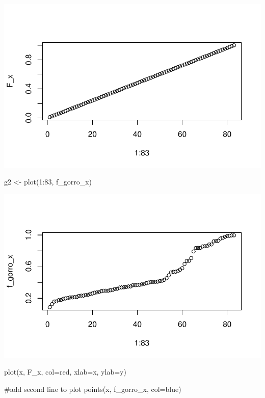 \documentclass[
  us-letterpaper,
]{scrreprt}
\newenvironment{Shaded}{\begin{snugshade}}{\end{snugshade}}
\newcommand{\AttributeTok}[1]{\textcolor[rgb]{0.40,0.45,0.13}{#1}}
\newcommand{\CommentTok}[1]{\textcolor[rgb]{0.37,0.37,0.37}{#1}}
\newcommand{\DecValTok}[1]{\textcolor[rgb]{0.68,0.00,0.00}{#1}}
\newcommand{\FunctionTok}[1]{\textcolor[rgb]{0.28,0.35,0.67}{#1}}
\newcommand{\NormalTok}[1]{\textcolor[rgb]{0.00,0.23,0.31}{#1}}
\newcommand{\OtherTok}[1]{\textcolor[rgb]{0.00,0.23,0.31}{#1}}
\newcommand{\SpecialCharTok}[1]{\textcolor[rgb]{0.37,0.37,0.37}{#1}}
\newcommand{\StringTok}[1]{\textcolor[rgb]{0.13,0.47,0.30}{#1}}
\theoremstyle{plain}
\theoremstyle{plain}
\theoremstyle{definition}
\theoremstyle{remark}
\begin{document}
\includegraphics{Estudio_caso_files/figure-pdf/unnamed-chunk-27-1.pdf}

\begin{Shaded}
\begin{Highlighting}[]
\NormalTok{g2 }\OtherTok{\textless{}{-}} \FunctionTok{plot}\NormalTok{(}\DecValTok{1}\SpecialCharTok{:}\DecValTok{83}\NormalTok{, f\_gorro\_x) }
\end{Highlighting}
\end{Shaded}

\includegraphics{Estudio_caso_files/figure-pdf/unnamed-chunk-27-2.pdf}

\begin{Shaded}
\begin{Highlighting}[]
\FunctionTok{plot}\NormalTok{(x, F\_x, }\AttributeTok{col=}\StringTok{\textquotesingle{}red\textquotesingle{}}\NormalTok{, }\AttributeTok{xlab=}\StringTok{\textquotesingle{}x\textquotesingle{}}\NormalTok{, }\AttributeTok{ylab=}\StringTok{\textquotesingle{}y\textquotesingle{}}\NormalTok{)}

\CommentTok{\#add second line to plot }
\FunctionTok{points}\NormalTok{(x, f\_gorro\_x, }\AttributeTok{col=}\StringTok{\textquotesingle{}blue\textquotesingle{}}\NormalTok{)}
\end{Highlighting}
\end{Shaded}
\end{document}
